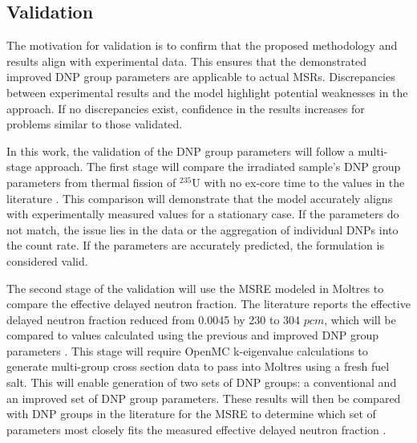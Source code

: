 \subsection{Validation}
The motivation for validation is to confirm that the proposed methodology and results align with experimental data.
This ensures that the demonstrated improved \gls{DNP} group parameters are applicable to actual \glspl{MSR}.
Discrepancies between experimental results and the model highlight potential weaknesses in the approach.
If no discrepancies exist, confidence in the results increases for problems similar to those validated.

In this work, the validation of the \gls{DNP} group parameters will follow a multi-stage approach.
The first stage will compare the irradiated sample's \gls{DNP} group parameters from thermal fission of $^{235}$U with no ex-core time to the values in the literature \cite{keepin1957delayed, charlton1996delayed, endf6, mills1991study, brady1989delayed, saleh1997measurements, synetos1983delayed, tuttle1975delayed, waldo1981delayed, parish1999status}.
This comparison will demonstrate that the model accurately aligns with experimentally measured values for a stationary case.
If the parameters do not match, the issue lies in the data or the aggregation of individual \glspl{DNP} into the count rate.
If the parameters are accurately predicted, the formulation is considered valid.

The second stage of the validation will use the \gls{MSRE} modeled in Moltres to compare the effective delayed neutron fraction.
The literature reports the effective delayed neutron fraction reduced from 0.0045 by 230 to 304 $pcm$, which will be compared to values calculated using the previous and improved \gls{DNP} group parameters \cite{haubenreich1970experience, shi2021gen, prince1968zero}.
This stage will require OpenMC k-eigenvalue calculations to generate multi-group cross section data to pass into Moltres using a fresh fuel salt.
This will enable generation of two sets of \gls{DNP} groups: a conventional and an improved set of \gls{DNP} group parameters.
These results will then be compared with \gls{DNP} groups in the literature for the \gls{MSRE} to determine which set of parameters most closely fits the measured effective delayed neutron fraction \cite{lee2022transient}.

